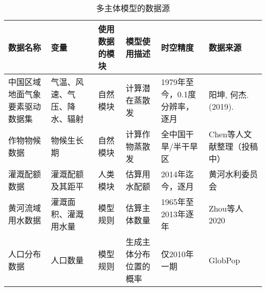 \begin{table}[htbp]
    \centering
    \caption{多主体模型的数据源}
      \begin{tabularx}{\textwidth}{LLLLLL}
      \toprule
      数据名称  & 变量    & 使用数据的模块 & 模型使用描述 & 时空精度  & 数据来源 \\
      \midrule
      中国区域地面气象要素驱动数据集 & 气温、风速、气压、降水、辐射 & 自然模块  & 计算潜在蒸散发 & 1979年至今，0.1度分辨率，逐月 & 阳坤, 何杰. (2019).  \\
      作物物候数据 & 物候生长期 & 自然模块  & 计算作物蒸散发 & 全中国干旱/半干旱区 & Chen等人文献整理（投稿中） \\
      灌溉配额数据 & 灌溉配额及其距平 & 人类模块  & 估算用水配额 & 2014年迄今，逐月 & 黄河水利委员会 \\
      黄河流域用水数据 & 灌溉面积、灌溉用水量 & 模型规则  & 估算主体数量 & 1965年至2013年逐年 & Zhou等人2020 \\
      人口分布数据 & 人口数量  & 模型规则  & 生成主体分布位置的概率 & 仅2010年一期 & GlobPop \\
      \bottomrule
      \end{tabularx}%
    \label{ch6:tab:dataset}%
  \end{table}%
  